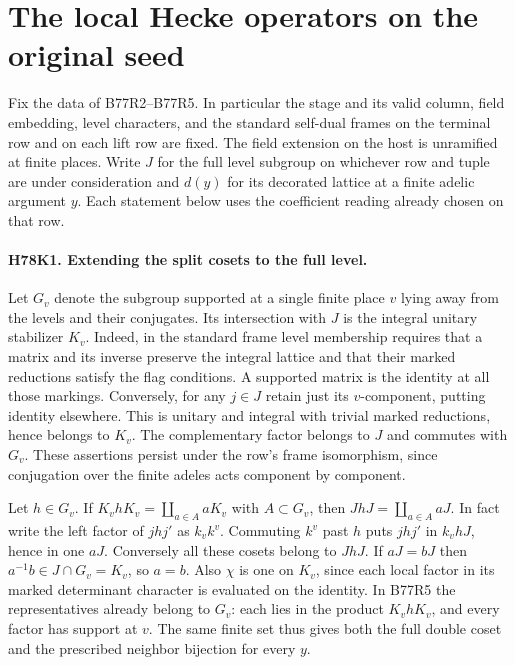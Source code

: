 \section{The local Hecke operators on the original seed}

Fix the data of B77R2--B77R5. In particular the stage and its valid
column, field embedding, level characters, and the standard self-dual
frames on the terminal row and on each lift row are fixed. The field
extension on the host is unramified at finite places. Write $J$ for
the full level subgroup on whichever row and tuple are under
consideration and $d(y)$ for its decorated lattice at a finite adelic
argument $y$. Each statement below uses the coefficient reading already
chosen on that row.

\paragraph{H78K1. Extending the split cosets to the full level.}
Let $G_v$ denote the subgroup supported at a single finite place $v$
lying away from the levels and their conjugates. Its intersection with
$J$ is the integral unitary stabilizer $K_v$. Indeed, in the standard
frame level membership requires that a matrix and its inverse preserve
the integral lattice and that their marked reductions satisfy the flag
conditions. A supported matrix is the identity at all those markings.
Conversely, for any $j\in J$ retain just its $v$-component, putting
identity elsewhere. This is unitary and integral with trivial marked
reductions, hence belongs to $K_v$. The complementary factor belongs
to $J$ and commutes with $G_v$. These assertions persist under the
row's frame isomorphism, since conjugation over the finite adeles
acts component by component.

Let $h\in G_v$. If $K_vhK_v=\coprod_{a\in A}aK_v$ with $A\subset
G_v$, then $JhJ=\coprod_{a\in A}aJ$. In fact write the left factor
of $jhj'$ as $k_v k^v$. Commuting $k^v$ past $h$ puts $jhj'$ in
$k_vhJ$, hence in one $aJ$. Conversely all these cosets belong to
$JhJ$. If $aJ=bJ$ then $a^{-1}b\in J\cap G_v=K_v$, so $a=b$.
Also $\chi$ is one on $K_v$, since each local factor in its marked
determinant character is evaluated on the identity. In B77R5 the
representatives already belong to $G_v$: each lies in the product
$K_vhK_v$, and every factor has support at $v$. The same finite
set thus gives both the full double coset and the prescribed
neighbor bijection for every $y$.

